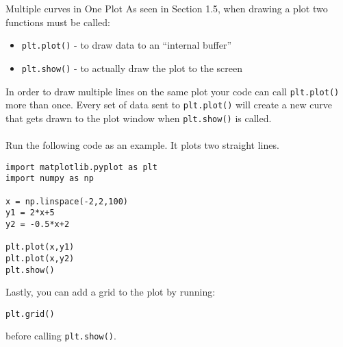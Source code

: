 \documentclass{lab}
\begin{document}
\begin{task}{Multiple curves in One Plot}{}
As seen in Section 1.5, when drawing a plot two functions must be called:
\begin{itemize}
\item \texttt{plt.plot()} - to draw data to an ``internal buffer''
\item \texttt{plt.show()} - to actually draw the plot to the screen
\end{itemize}
In order to draw multiple lines on the same plot your code can call \texttt{plt.plot()} more than once. Every set of data sent to \texttt{plt.plot()} will create a new curve that gets drawn to the plot window when \texttt{plt.show()} is called.
\\~\\
Run the following code as an example. It plots two straight lines.
\begin{lstlisting}
import matplotlib.pyplot as plt
import numpy as np

x = np.linspace(-2,2,100)
y1 = 2*x+5
y2 = -0.5*x+2

plt.plot(x,y1)
plt.plot(x,y2)
plt.show()
\end{lstlisting}

Lastly, you can add a grid to the plot by running:
\begin{lstlisting}
plt.grid()
\end{lstlisting}
before calling \texttt{plt.show()}.
\end{task}
\pagebreak
\end{document}
